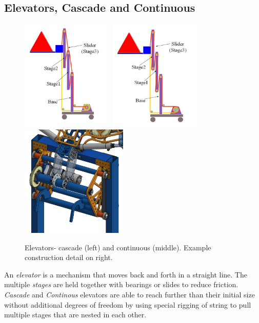 \documentclass[10pt,letterpaper]{book}
\begin{document}
\subsection{Elevators, Cascade and Continuous}

\begin{figure}[H]
	\includegraphics[height=2.1in]{imgs/elevator_cascade.jpeg}
	\includegraphics[height=2.1in]{imgs/elevator_continuous.jpeg}
	\includegraphics[height=2.1in]{imgs/elevator_construction.png}
	\caption{Elevators- cascade (left) and continuous (middle). Example construction detail on right.}
\end{figure}

An \textit{elevator} is a mechanism that moves back and forth in a straight line. The multiple \textit{stages} are held together with bearings or slides to reduce friction. \textit{Cascade} and \textit{Continous} elevators are able to reach further than their initial size without additional degrees of freedom by using special rigging of string to pull multiple stages that are nested in each other.
\end{document}
